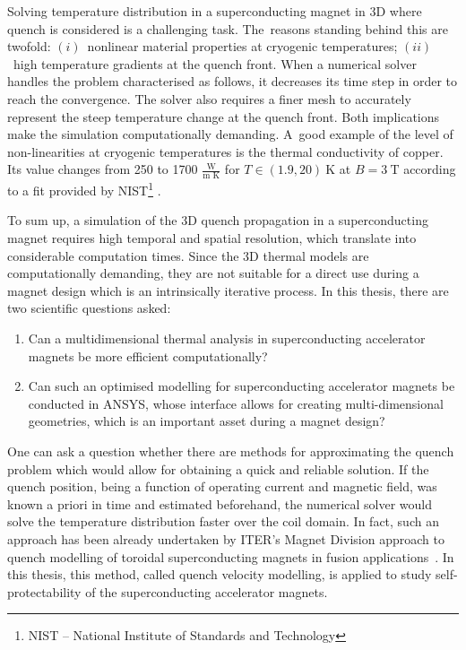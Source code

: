 
Solving temperature distribution in a superconducting magnet in 3D where quench is considered is a challenging task. The~reasons standing behind this are twofold: $(i)$~nonlinear material properties at cryogenic temperatures; $(ii)$~high temperature gradients at the quench front. When a numerical solver handles the problem characterised as follows, it decreases its time step in order to reach the convergence. The solver also requires a finer mesh to accurately represent the steep temperature change at the quench front. Both implications make the simulation computationally demanding. A~good example of the level of non-linearities at cryogenic temperatures is the thermal conductivity of copper. Its value changes from 250 to 1700 $\frac{\text{W}}{\text{m K}}$ for $T \in (1.9, 20)~\text{K}$ at $B=3~\text{T}$ according to a fit provided by NIST\footnote{NIST -- National Institute of Standards and Technology} \cite[p.~9-13]{material_properties_roxie}. 

To sum up, a simulation of the 3D quench propagation in a superconducting magnet requires high temporal and spatial resolution, which translate into considerable computation times. Since the 3D thermal models are computationally demanding, they are not suitable for a direct use during a magnet design which is an intrinsically iterative process. In this thesis, there are two scientific questions asked:

\begin{enumerate}
\item Can a multidimensional thermal analysis in superconducting accelerator magnets be more efficient computationally?
\item  Can such an optimised modelling for superconducting accelerator magnets be conducted in ANSYS, whose interface allows for creating multi-dimensional geometries, which is an important asset during a magnet design?
\end{enumerate}

One can ask a question whether there are methods for approximating the quench problem which would allow for obtaining a quick and reliable solution. If the quench position, being a function of operating current and magnetic field, was known a priori in time and estimated beforehand, the numerical solver would solve the temperature distribution faster over the coil domain. In fact, such an approach has been already undertaken by ITER's Magnet Division approach to quench modelling of toroidal superconducting magnets in fusion applications~\cite{iter_presentation_qualified_analysis, iter_fault_case_study}. In this thesis, this method, called quench velocity modelling, is applied to study self-protectability of the superconducting accelerator magnets. 
